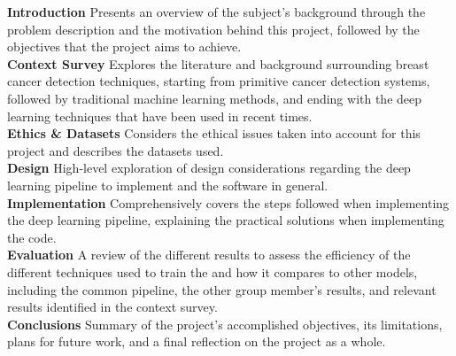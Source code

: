 \tab \textbf{Introduction} \space 
Presents an overview of the subject's background through the problem description and the motivation behind this project, followed by the objectives that the project aims to achieve.\\

\textbf{Context Survey} \space
Explores the literature and background surrounding breast cancer detection techniques, starting from primitive cancer detection systems, followed by traditional machine learning methods, and ending with the deep learning techniques that have been used in recent times.\\

\textbf{Ethics \& Datasets} \space
Considers the ethical issues taken into account for this project and describes the datasets used.\\

\textbf{Design} \space
High-level exploration of design considerations regarding the deep learning pipeline to implement and the software in general.\\

\textbf{Implementation} \space
Comprehensively covers the steps followed when implementing the deep learning pipeline, explaining the practical solutions when implementing the code.\\ %

\textbf{Evaluation} \space
A review of the different results to assess the efficiency of the different techniques used to train the and how it compares to other models, including the common pipeline, the other group member's results, and relevant results identified in the context survey.\\

\textbf{Conclusions} \space
Summary of the project's accomplished objectives, its limitations, plans for future work, and a ﬁnal reflection on the project as a whole.